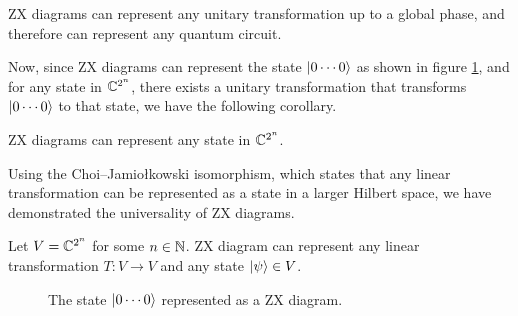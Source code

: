 \begin{lemma}
	ZX diagrams can represent any unitary transformation up to a global phase, and therefore can represent any quantum circuit.
\end{lemma}

Now, since ZX diagrams can represent the state $| 0 \cdots 0 \rangle$ as shown in figure \ref{fig:zero_state}, and for any state in $\mathbb{C}^{2^n}$, there exists a unitary transformation that transforms $| 0 \cdots 0 \rangle$ to that state, we have the following corollary.

\begin{corollary}
	ZX diagrams can represent any state in $\mathbb{C}^{2^n}$.
\end{corollary}

Using the Choi–Jamiołkowski isomorphism, which states that any linear transformation can be represented as a state in a larger Hilbert space, we have demonstrated the universality of ZX diagrams.

\begin{theorem}
	Let $V = \mathbb{C}^{2^n}$ for some $n \in \mathbb{N}$. 
	ZX diagram can represent any linear transformation $T: V \to V$ and any state $| \psi \rangle \in V$.
\end{theorem}

\begin{figure}[ht]
	\centering
	
	\caption{The state $| 0 \cdots 0 \rangle$ represented as a ZX diagram.} 
	\label{fig:zero_state}
\end{figure}


